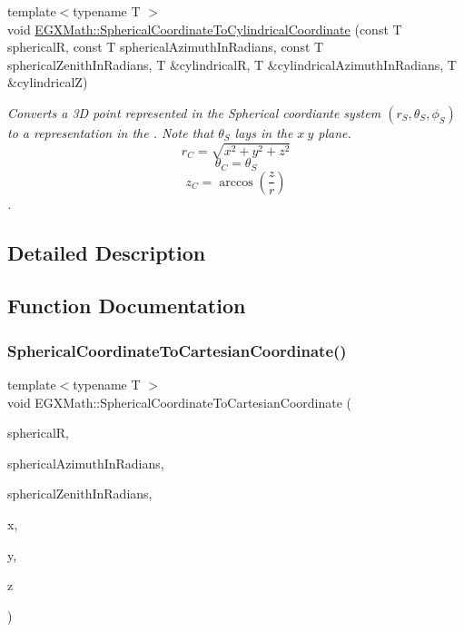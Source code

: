 \begin{DoxyCompactItemize}
{\footnotesize template$<$typename T $>$ }\\void \mbox{\hyperlink{group___e_g_x_math-_conversions-_coordinate_conversions-3_d-_spherical_ga2a5678de0dda7c875a668f3db3da3418}{E\+G\+X\+Math\+::\+Spherical\+Coordinate\+To\+Cylindrical\+Coordinate}} (const T sphericalR, const T spherical\+Azimuth\+In\+Radians, const T spherical\+Zenith\+In\+Radians, T \&cylindricalR, T \&cylindrical\+Azimuth\+In\+Radians, T \&cylindricalZ)
\begin{DoxyCompactList}\small\item\em Converts a 3D point represented in the Spherical coordiante system $(r_S,\theta_S,\phi_S)$ to a representation in the . Note that $\theta_S$ lays in the $x\ y$ plane. \[ r_C = \sqrt{x^2+y^2+z^2} \] \[ \theta_C = \theta_S \] \[ z_C = \arccos(\frac{z}{r}) \]. \end{DoxyCompactList}\end{DoxyCompactItemize}


\subsection{Detailed Description}


\subsection{Function Documentation}
\mbox{\label{group___e_g_x_math-_conversions-_coordinate_conversions-3_d-_spherical_ga3141fcb31751df8a24b5474de768b375}} 
\subsubsection{\texorpdfstring{Spherical\+Coordinate\+To\+Cartesian\+Coordinate()}{SphericalCoordinateToCartesianCoordinate()}}
{\footnotesize\ttfamily template$<$typename T $>$ \\
void E\+G\+X\+Math\+::\+Spherical\+Coordinate\+To\+Cartesian\+Coordinate (\begin{DoxyParamCaption}\item[{const T}]{sphericalR,  }\item[{const T}]{spherical\+Azimuth\+In\+Radians,  }\item[{const T}]{spherical\+Zenith\+In\+Radians,  }\item[{T \&}]{x,  }\item[{T \&}]{y,  }\item[{T \&}]{z }\end{DoxyParamCaption})}



